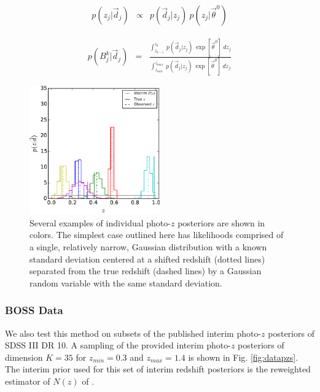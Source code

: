\documentclass[preprint]{aastex}
\begin{document}
\begin{eqnarray}
\label{eq:likpost}
p(z_{j}|\vec{d}_{j}) &\propto& p(\vec{d}_{j}|z_{j})\ p(z_{j}|\vec{\theta}^{0})
\end{eqnarray}

\begin{eqnarray}
\label{eq:norm}
p(B^{k}_{j}|\vec{d}_{j}) &=& \frac{\int_{z_{k-1}}^{z_{k}}\ 
p(\vec{d}_{j}|z_{j})\ \exp[\vec{\theta}^{0}]\ dz_{j}}{\int_{z_{min}}^{z_{max}}\ 
p(\vec{d}_{j}|z_{j})\ \exp[\vec{\theta}^{0}]\ dz_{j}}
\end{eqnarray}

\begin{figure}
\includegraphics[width=0.5\textwidth]{figs/null/samplepzs.pdf}
\caption{Several examples of individual photo-$z$ posteriors are shown in 
colors.  The simplest case outlined here has likelihoods comprised of a single, 
relatively narrow, Gaussian distribution with a known standard deviation 
centered at a shifted redshift (dotted lines) separated from the true redshift 
(dashed lines) by a Gaussian random variable with the same standard deviation.}
\label{fig:nullpzs}
\end{figure}

\clearpage
\subsubsection{BOSS Data}
\label{sec:data}

We also test this method on subsets of the published interim photo-$z$ 
posteriors of SDSS III DR 10.  A sampling of the provided interim photo-$z$ 
posteriors of dimension $K=35$ for $z_{min}=0.3$ and $z_{max}=1.4$ is shown in 
Fig. \ref{fig:datapzs}.  The interim prior used for this set of interim 
redshift posteriors is the reweighted estimator of $N(z)$ of 
\citet{Sheldon2012}.
\end{document}
